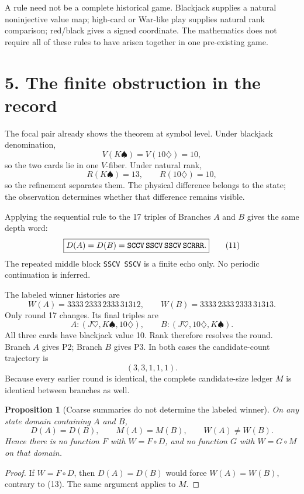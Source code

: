 \documentclass[9pt]{extarticle}
\theoremstyle{cgplain}
\newtheorem{proposition}{Proposition}
\theoremstyle{definition}
\begin{document}
A rule need not be a complete historical game. Blackjack supplies a natural noninjective value map; high-card or War-like play supplies natural rank comparison; red/black gives a signed coordinate. The mathematics does not require all of these rules to have arisen together in one pre-existing game.

\section*{5. The finite obstruction in the record}
The focal pair already shows the theorem at symbol level. Under blackjack denomination,
\[
V(K\spadesuit)=V(10\diamondsuit)=10,
\tag{9}
\]
so the two cards lie in one $V$-fiber. Under natural rank,
\[
R(K\spadesuit)=13,\qquad R(10\diamondsuit)=10,
\tag{10}
\]
so the refinement separates them. The physical difference belongs to the state; the observation determines whether that difference remains visible.

Applying the sequential rule to the 17 triples of Branches $A$ and $B$ gives the same depth word:
\[
\boxed{D(A)=D(B)=\texttt{SCCV\,SSCV\,SSCV\,SCRRR}.}
\tag{11}
\]
The repeated middle block \texttt{SSCV SSCV} is a finite echo only. No periodic continuation is inferred.

The labeled winner histories are
\[
\boxed{W(A)=3333\,2333\,2333\,31312,}
\qquad
\boxed{W(B)=3333\,2333\,2333\,31313.}
\tag{12}
\]
Only round 17 changes. Its final triples are
\[
A:(J\heartsuit,K\spadesuit,10\diamondsuit),\qquad
B:(J\heartsuit,10\diamondsuit,K\spadesuit).
\tag{13}
\]
All three cards have blackjack value 10. Rank therefore resolves the round. Branch $A$ gives P2; Branch $B$ gives P3. In both cases the candidate-count trajectory is
\[
(3,3,1,1,1).
\tag{14}
\]
Because every earlier round is identical, the complete candidate-size ledger $M$ is identical between branches as well.

\begin{proposition}[Coarse summaries do not determine the labeled winner]
On any state domain containing $A$ and $B$,
\[
\boxed{D(A)=D(B),\qquad M(A)=M(B),\qquad W(A)\neq W(B).}
\tag{15}
\]
Hence there is no function $F$ with $W=F\circ D$, and no function $G$ with $W=G\circ M$ on that domain.
\end{proposition}

\begin{proof}
If $W=F\circ D$, then $D(A)=D(B)$ would force $W(A)=W(B)$, contrary to (13). The same argument applies to $M$.
\end{proof}
\end{document}
